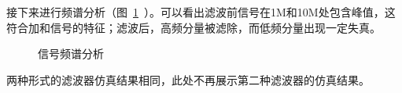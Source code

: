 \documentclass[lang=cn,newtx,10pt,scheme=chinese]{elegantbook}
\begin{document}
接下来进行频谱分析（图~\ref{fig:exp4:spectrum}~）。可以看出滤波前信号在1M和10M处包含峰值，这符合加和信号的特征；滤波后，高频分量被滤除，而低频分量出现一定失真。

\begin{figure}[htbp]
  \centering
  \hfill
  \caption{信号频谱分析}
  \label{fig:exp4:spectrum}
\end{figure}

\begin{remark}
两种形式的滤波器仿真结果相同，此处不再展示第二种滤波器的仿真结果。
\end{remark}
\end{document}
